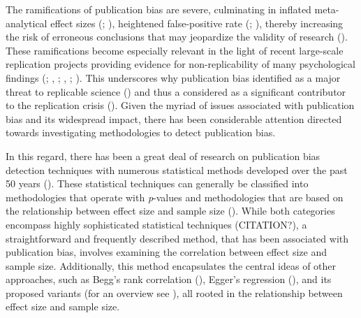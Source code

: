 \documentclass[
  12pt,
]{scrartcl}
\begin{document}
The ramifications of publication bias are severe, culminating in
inflated meta-analytical effect sizes
(;
), heightened
false-positive rate (;
), thereby
increasing the risk of erroneous conclusions that may jeopardize the
validity of research ().
These ramifications become especially relevant in the light of recent
large-scale replication projects providing evidence for
non-replicability of many psychological findings
(;
,
;
,
;
). This underscores why publication bias identified
as a major threat to replicable science
() and thus a
considered as a significant contributor to the replication crisis
(). Given
the myriad of issues associated with publication bias and its widespread
impact, there has been considerable attention directed towards
investigating methodologies to detect publication bias.

In this regard, there has been a great deal of research on publication
bias detection techniques with numerous statistical methods developed
over the past 50 years
(). These statistical techniques can generally be classified into
methodologies that operate with \emph{p}-values and methodologies that
are based on the relationship between effect size and sample size
(). While both
categories encompass highly sophisticated statistical techniques
(CITATION?), a straightforward and frequently described method, that has
been associated with publication bias, involves examining the
correlation between effect size and sample size. Additionally, this
method encapsulates the central ideas of other approaches, such as
Begg's rank correlation (), Egger's regression
(), and its proposed
variants (for an overview see
), all rooted
in the relationship between effect size and sample size.
\end{document}
